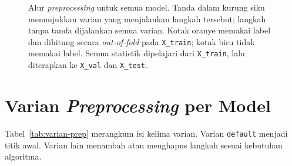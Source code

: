 \begin{figure}[!t]
	\caption{Alur \textit{preprocessing} untuk semua model. Tanda dalam kurung siku
	menunjukkan varian yang menjalankan langkah tersebut; langkah tanpa tanda
	dijalankan semua varian. Kotak oranye memakai label dan dihitung secara
	\textit{out-of-fold} pada \texttt{X\_train}; kotak biru tidak memakai label.
	Semua statistik dipelajari dari \texttt{X\_train}, lalu diterapkan ke
	\texttt{X\_val} dan \texttt{X\_test}.}
	\label{fig:alur-prep}
\end{figure}

\section{Varian \textit{Preprocessing} per Model}
\label{sec:varian}

Tabel~\ref{tab:varian-prep} merangkum isi kelima varian. Varian
\texttt{default} menjadi titik awal. Varian lain menambah atau menghapus langkah
sesuai kebutuhan algoritma.


